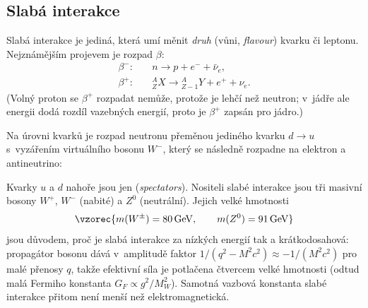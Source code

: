 \subsection{Slabá interakce}

Slabá interakce je jediná, která umí měnit \emph{druh} (vůni, \emph{flavour}) kvarku či leptonu. Nejznámějším projevem je rozpad $\beta$:
\begin{align}
  \beta^-:&\quad n \to p + e^- + \bar\nu_e, \\
  \beta^+:&\quad {}^{A}_{Z}X \to {}^{A}_{Z-1}Y + e^+ + \nu_e .
\end{align}
(Volný proton se $\beta^+$ rozpadat nemůže, protože je lehčí než neutron; v~jádře ale energii dodá rozdíl vazebných energií, proto je $\beta^+$ zapsán pro jádro.)

Na úrovni kvarků je rozpad neutronu přeměnou jediného kvarku $d\to u$ s~vyzářením virtuálního bosonu $W^-$, který se následně rozpadne na elektron a antineutrino:
\begin{center}
\end{center}
Kvarky $u$ a $d$ nahoře jsou jen  (\emph{spectators}). Nositeli slabé interakce jsou tři masivní bosony $W^+$, $W^-$ (nabité) a $Z^0$ (neutrální). Jejich velké hmotnosti
\begin{equation}
  \vzorec{m(W^\pm) = 80\,\mathrm{GeV}, \qquad m(Z^0) = 91\,\mathrm{GeV}}
\end{equation}
jsou důvodem, proč je slabá interakce za nízkých energií tak  a krátkodosahová: propagátor bosonu dává v~amplitudě faktor $1/(q^2 - M^2c^2)\approx -1/(M^2c^2)$ pro malé přenosy $q$, takže efektivní síla je potlačena čtvercem velké hmotnosti (odtud malá Fermiho konstanta $G_F\propto g^2/M_W^2$). Samotná vazbová konstanta slabé interakce přitom není menší než elektromagnetická.


